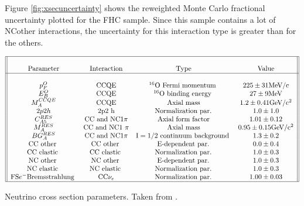 Figure \ref{fig:xsecuncertainty} shows the reweighted Monte Carlo fractional uncertainty plotted for the FHC sample. Since this sample contains a lot of NCother interactions, the uncertainty for this interaction type is greater than for the others.

\begin{table}
    \centering
        $\begin{array}{||cccc||}
        \hline & & & \\
        \text { Parameter } & \text { Interaction } & \text { Type } & \text { Value } \\
        \hline & & & \\
        p_{F}^{O} & \text{CCQE} & { }^{16} \text{O} \text { Fermi momentum } & 225 \pm 31 \text{MeV} / \text{c} \\
        E_{B}^{O} & \text{CCQE} & { }^{16} \text{O} \text { binding energy } & 27 \pm 9 \text{MeV} \\
        M_{A}^{C C Q E} & \text{CCQE} & \text { Axial mass } & 1.2 \pm 0.41 \text{GeV} / \text{c}^{2}\\
        2 p 2 h & 2 \text{p} 2 \text{~h} & \text { Normalization par. } & 1.0 \pm 1.0 \\
        C_{A 5}^{R E S}& \text{CC} \text { and } \text{NC} 1 \pi & \text { Axial form factor } & 1.01 \pm 0.12 \\
        M_{A}^{R E S}  & \text{CC} \text { and NC1 } \pi & \text { Axial mass } & 0.95 \pm 0.15 \text{GeV} / \text{c}^{2} \\
        B G_{A}^{R E S} & \text{CC} \text { and } \text{NC} 1 \pi & \text{I}=1 / 2 \text { continuum background } & 1.3 \pm 0.2 \\
        \text{CC} \text { other } & \text{CC} \text { other } & \text { E-dependent par. } & 0.0 \pm 0.4 \\
        \text{CC} \text { elastic } & \text{CC} \text { elastic } & \text { Normalization par. } & 1.0 \pm 0.3 \\
        \text{NC} \text { other } & \text{NC} \text { other } & \text { E-dependent par. } & 1.0 \pm 0.3 \\
        \text{NC} \text { elastic } & \text{NC} \text {  elastic } & \text { Normalization par. } & 1.0 \pm 0.3 \\
        \text{FS} e^{-} \text {Bremsstrahlung } & \text{CC} \nu_{e} & \text { Normalization par. } & 1.00 \pm 0.03 \\
        \hline
        \end{array}$
        \caption{Neutrino cross section parameters. Taken from \cite{nu_xsec}.}
        \label{table:xsectable}
\end{table}


